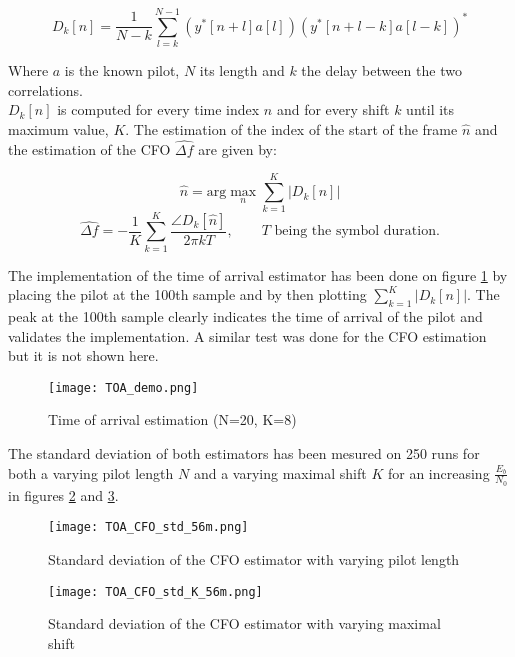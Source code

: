 \begin{equation*}
    D_k[n] = \frac{1}{N-k} \sum_{l=k}^{N-1} \left(y^*[n+l]a[l]\right) \left(y^*[n+l-k]a[l-k]\right)^*
\end{equation*}

Where $a$ is the known pilot, $N$ its length and $k$ the delay between the two correlations. \\
$D_k[n]$ is computed for every time index $n$ and for every shift $k$ until its maximum value, $K$. The estimation of the index of the start of the frame $\hat{n}$ and the estimation of the CFO $\hat{\Delta f}$ are given by:

\begin{equation*}
    \hat{n} = \text{arg} \max_n \sum_{k=1}^{K} |D_k[n]|
\end{equation*}
\begin{equation*}
    \hat{\Delta f} = -\frac{1}{K} \sum_{k=1}^{K} \frac{\angle D_k[\hat{n}]}{2\pi kT}, \qquad T \text{ being the symbol duration.}
\end{equation*}

The implementation of the time of arrival estimator has been done on figure \ref{fig:TOA_demo} by placing the pilot at the 100th sample and by then plotting $\sum_{k=1}^{K} |D_k[n]|$. The peak at the 100th sample clearly indicates the time of arrival of the pilot and validates the implementation. A similar test was done for the CFO estimation but it is not shown here. \\

\begin{figure}[H]
    \centering
    \texttt{[image: TOA\_demo.png]}
    \caption{Time of arrival estimation (N=20, K=8)}
    \label{fig:TOA_demo}
\end{figure}

The standard deviation of both estimators has been mesured on 250 runs for both a varying pilot length $N$ and a varying maximal shift $K$ for an increasing $\frac{E_b}{N_0}$ in figures \ref{fig:TOA_CFO_std_N} and \ref{fig:TOA_CFO_std_K}. 

\begin{figure}[H]
    \centering
    \texttt{[image: TOA\_CFO\_std\_56m.png]}
    \caption{Standard deviation of the CFO estimator with varying pilot length}
    \label{fig:TOA_CFO_std_N}
\end{figure}

\begin{figure}[H]
    \centering
    \texttt{[image: TOA\_CFO\_std\_K\_56m.png]}
    \caption{Standard deviation of the CFO estimator with varying maximal shift}
    \label{fig:TOA_CFO_std_K}
\end{figure}

